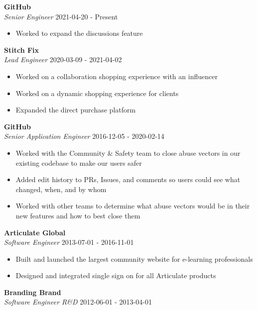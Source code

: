 \documentclass[a4paper]{article}
\begin{document}
\textbf{GitHub}\\
\textit{Senior Engineer} \hfill 2021-04-20 - Present\\
\vspace{-1mm}
\begin{itemize} \itemsep 1pt
	\item Worked to expand the discussions feature
\end{itemize}
\textbf{Stitch Fix}\\
\textit{Lead Engineer} \hfill 2020-03-09 - 2021-04-02\\
\vspace{-1mm}
\begin{itemize} \itemsep 1pt
	\item Worked on a collaboration shopping experience with an influencer
	\item Worked on a dynamic shopping experience for clients
	\item Expanded the direct purchase platform
\end{itemize}
\textbf{GitHub}\\
\textit{Senior Application Engineer} \hfill 2016-12-05 - 2020-02-14\\
\vspace{-1mm}
\begin{itemize} \itemsep 1pt
	\item Worked with the Community \& Safety team to close abuse vectors in our existing codebase to make our users safer
	\item Added edit history to PRs, Issues, and comments so users could see what changed, when, and by whom
	\item Worked with other teams to determine what abuse vectors would be in their new features and how to best close them
\end{itemize}
\textbf{Articulate Global}\\
\textit{Software Engineer} \hfill 2013-07-01 - 2016-11-01\\
\vspace{-1mm}
\begin{itemize} \itemsep 1pt
	\item Built and launched the largest community website for e-learning professionals
	\item Designed and integrated single sign on for all Articulate products
\end{itemize}
\textbf{Branding Brand}\\
\textit{Software Engineer R\&D} \hfill 2012-06-01 - 2013-04-01\\
\end{document}
